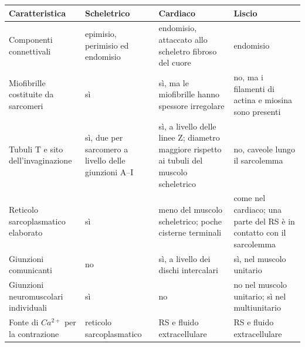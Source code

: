 \begin{table}[htbp]
  \centering
  \small
  \renewcommand{\arraystretch}{1.3}
  \begin{tabularx}{\textwidth}{|l|X|X|X|}
    \hline
    \textbf{Caratteristica} & \textbf{Scheletrico} & \textbf{Cardiaco} & \textbf{Liscio} \\
    \hline
    Componenti connettivali & epimisio, perimisio ed endomisio & endomisio, attaccato allo scheletro fibroso del cuore & endomisio \\
    \hline
    Miofibrille costituite da sarcomeri & sì & sì, ma le miofibrille hanno spessore irregolare & no, ma i filamenti di actina e miosina sono presenti \\
    \hline
    Tubuli T e sito dell'invaginazione & sì, due per sarcomero a livello delle giunzioni A--I & sì, a livello delle linee Z; diametro maggiore rispetto ai tubuli del muscolo scheletrico & no, caveole lungo il sarcolemma \\
    \hline
    Reticolo sarcoplasmatico elaborato & sì & meno del muscolo scheletrico; poche cisterne terminali & come nel cardiaco; una parte del RS è in contatto con il sarcolemma \\
    \hline
    Giunzioni comunicanti & no & sì, a livello dei dischi intercalari & sì, nel muscolo unitario \\
    \hline
    Giunzioni neuromuscolari individuali & sì & no & no nel muscolo unitario; sì nel multiunitario \\
    \hline
    Fonte di $Ca^{2+}$ per la contrazione & reticolo sarcoplasmatico & RS e fluido extracellulare & RS e fluido extracellulare \\
    \hline
  \end{tabularx}
\end{table}
